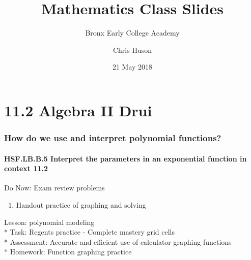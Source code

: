 \documentclass{beamer}
\title{Mathematics Class Slides}
\subtitle{Bronx Early College Academy}
\author{Chris Huson}
\date{21 May 2018}
\begin{document}
\frame{\titlepage}


\section{11.2 Algebra II Drui}
\frame
{
  \frametitle{How do we use and interpret polynomial functions?}
  \framesubtitle{HSF.LB.B.5 Interpret the parameters in an exponential function in context \qquad \alert{11.2}}

  \begin{block}{Do Now: Exam review problems}
  \begin{enumerate}
    \item Handout practice of graphing and solving%
    \end{enumerate}
  \end{block}
  Lesson: polynomial modeling\\*
  Task: Regents practice - Complete mastery grid cells\\*
  Assessment: Accurate and efficient use of calculator graphing functions \\*
  Homework: Function graphing practice\\}
\end{document}
